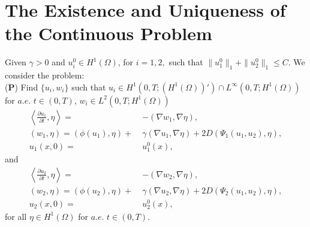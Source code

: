 \setcounter{equation}{0}
\section{The Existence and Uniqueness of the Continuous Problem}
Given $\gamma > 0$ and $u_i^0\in H^1(\Omega)$, for $i=1,2,$ such that
$\|u_1^0\|_1+\|u_2^0\|_1\leq C$.  We consider the problem: \\
({\textbf P}) \quad Find
$\{u_i, w_i\}$  such that $u_i \in
H^1(0,T;(H^1(\Omega))')\cap L^\infty(0,T;H^1(\Omega))$ for $a.e.$\; $t\in(0,T)$, $ w_i \in L^2(0,T;H^1(\Omega))$ 
\eqlabon 
\begin{align} 
\left \langle\frac{\partial u_{1}}{\partial t},\eta \right\rangle
=\;& - (\nabla w_{1}  ,\nabla\eta ),\label{2B0000a}\\
(w_{1},\eta) =(\phi(u_1),\eta)+\;& \gamma (\nabla u_{1},\nabla\eta )+2D (\Psi_1(u_1,u_2),\eta),\label{2B0000b}\\
u_1(x,0) =\;&  u^0_1(x),\label{2B0000c}
\end{align}
and
\begin{align} 
\left\langle\frac{\partial u_{2}}{\partial t},\eta \right\rangle =\;&  - (\nabla w_{2}  ,\nabla\eta ),\label{2B0000d}\\
(w_{2},\eta) =(\phi(u_2),\eta)+\;& \gamma (\nabla u_{2},\nabla\eta )+2D(\Psi_2(u_1,u_2),\eta),\label{2B0000e}\\
u_2(x,0)=\;&  u^0_2(x),\label{2B0000f}
\end{align}
for all $\eta\in H^1(\Omega)$ for $a.e.$\; $t\in(0,T)$.
\eqlaboff


